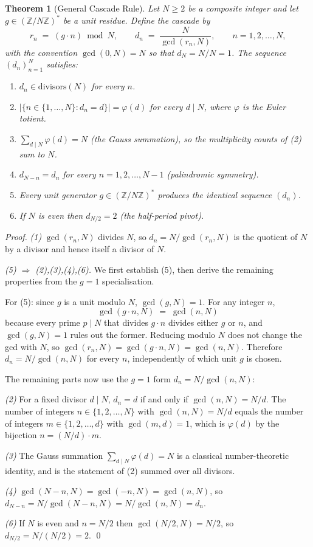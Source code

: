 \documentclass[11pt,a4paper]{article}
\newtheorem{theorem}{Theorem}[section]
\theoremstyle{definition}
\theoremstyle{remark}
\begin{document}
\begin{theorem}[General Cascade Rule]\label{thm:general-cascade}
Let $N\ge 2$ be a composite integer and let $g\in(\mathbb{Z}/N\mathbb{Z})^{*}$ be a unit residue. Define the cascade by
\[
r_{n} \;=\; (g\cdot n)\bmod N, \qquad d_{n} \;=\; \frac{N}{\gcd(r_{n},N)}, \qquad n = 1,2,\ldots,N,
\]
with the convention $\gcd(0,N)=N$ so that $d_{N} = N/N = 1$. The sequence $(d_{n})_{n=1}^{N}$ satisfies:
\begin{enumerate}[leftmargin=*,label=\textnormal{(\arabic*)}]
\item $d_{n} \in \mathrm{divisors}(N)$ for every $n$.
\item $\bigl|\{n\in\{1,\ldots,N\} : d_{n} = d\}\bigr| = \varphi(d)$ for every $d\mid N$, where $\varphi$ is the Euler totient.
\item $\sum_{d\mid N}\varphi(d) = N$ (the Gauss summation), so the multiplicity counts of \textnormal{(2)} sum to $N$.
\item $d_{N-n} = d_{n}$ for every $n = 1,2,\ldots,N-1$ (palindromic symmetry).
\item Every unit generator $g\in(\mathbb{Z}/N\mathbb{Z})^{*}$ produces the identical sequence $(d_{n})$.
\item If $N$ is even then $d_{N/2} = 2$ (the half-period pivot).
\end{enumerate}
\end{theorem}

\begin{proof}
\emph{(1)} $\gcd(r_{n},N)$ divides $N$, so $d_{n} = N/\gcd(r_{n},N)$ is the quotient of $N$ by a divisor and hence itself a divisor of $N$.

\emph{(5) $\Rightarrow$ (2),(3),(4),(6).} We first establish (5), then derive the remaining properties from the $g=1$ specialisation.

For (5): since $g$ is a unit modulo $N$, $\gcd(g,N)=1$. For any integer $n$,
\[
\gcd(g\cdot n, N) \;=\; \gcd(n, N)
\]
because every prime $p\mid N$ that divides $g\cdot n$ divides either $g$ or $n$, and $\gcd(g,N)=1$ rules out the former. Reducing modulo $N$ does not change the gcd with $N$, so $\gcd(r_{n},N) = \gcd(g\cdot n, N) = \gcd(n,N)$. Therefore $d_{n} = N/\gcd(n,N)$ for every $n$, independently of which unit $g$ is chosen.

The remaining parts now use the $g=1$ form $d_{n} = N/\gcd(n,N)$:

\emph{(2)} For a fixed divisor $d\mid N$, $d_{n} = d$ if and only if $\gcd(n,N) = N/d$. The number of integers $n \in \{1,2,\ldots,N\}$ with $\gcd(n,N) = N/d$ equals the number of integers $m \in \{1,2,\ldots,d\}$ with $\gcd(m,d) = 1$, which is $\varphi(d)$ by the bijection $n = (N/d)\cdot m$.

\emph{(3)} The Gauss summation $\sum_{d\mid N}\varphi(d) = N$ is a classical number-theoretic identity, and is the statement of \textnormal{(2)} summed over all divisors.

\emph{(4)} $\gcd(N-n,N) = \gcd(-n,N) = \gcd(n,N)$, so $d_{N-n} = N/\gcd(N-n,N) = N/\gcd(n,N) = d_{n}$.

\emph{(6)} If $N$ is even and $n=N/2$ then $\gcd(N/2, N) = N/2$, so $d_{N/2} = N/(N/2) = 2$. \qed
\end{proof}
\end{document}
